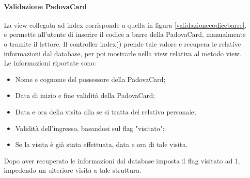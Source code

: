 \begin{table}[H]
\centering
{}
\caption{Controller:CardsController}
\end{table}

\paragraph{Validazione PadovaCard}
La view collegata ad index corrisponde a quella in figura \ref{validazionecodicebarre}, e permette all'utente di inserire il codice a barre della PadovaCard, manualmente o tramite il lettore.
Il controller index() prende tale valore e recupera le relative informazioni dal database, per poi mostrarle nella view relativa al metodo view. Le informazioni riportate sono:
\begin{itemize}
\item Nome e cognome del possessore della PadovaCard;
\item Data di inizio e fine validità della PadovaCard;
\item Data e ora della visita alla \cappella se si tratta del relativo personale;
\item Validità dell'ingresso, basandosi sul flag "visitato";
\item Se la visita è già stata effettuata, data e ora di tale visita.
\end{itemize}
Dopo aver recuperato le informazioni dal database imposta il flag visitato ad 1, impedendo un ulteriore visita a tale struttura.\\


